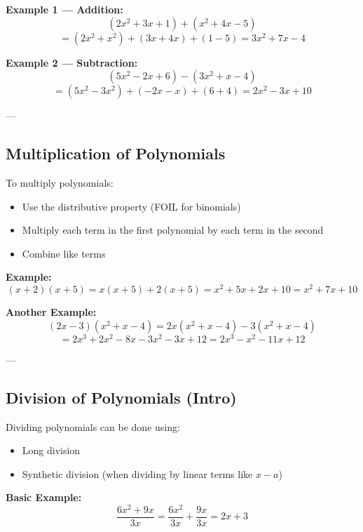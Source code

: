 \documentclass[11pt]{article}
\begin{document}
\textbf{Example 1 — Addition:}
\[
(2x^2 + 3x + 1) + (x^2 + 4x - 5)
\]
\[
= (2x^2 + x^2) + (3x + 4x) + (1 - 5) = 3x^2 + 7x - 4
\]

\textbf{Example 2 — Subtraction:}
\[
(5x^2 - 2x + 6) - (3x^2 + x - 4)
\]
\[
= (5x^2 - 3x^2) + (-2x - x) + (6 + 4) = 2x^2 - 3x + 10
\]

---

\subsection{Multiplication of Polynomials}

To multiply polynomials:
\begin{itemize}
  \item Use the distributive property (FOIL for binomials)
  \item Multiply each term in the first polynomial by each term in the second
  \item Combine like terms
\end{itemize}

\textbf{Example:}
\[
(x + 2)(x + 5)
= x(x + 5) + 2(x + 5)
= x^2 + 5x + 2x + 10
= x^2 + 7x + 10
\]

\textbf{Another Example:}
\[
(2x - 3)(x^2 + x - 4)
= 2x(x^2 + x - 4) - 3(x^2 + x - 4)
\]
\[
= 2x^3 + 2x^2 - 8x - 3x^2 - 3x + 12
= 2x^3 - x^2 - 11x + 12
\]

---

\subsection{Division of Polynomials (Intro)}

Dividing polynomials can be done using:
\begin{itemize}
  \item Long division
  \item Synthetic division (when dividing by linear terms like \( x - a \))
\end{itemize}

\textbf{Basic Example:}
\[
\frac{6x^2 + 9x}{3x} = \frac{6x^2}{3x} + \frac{9x}{3x} = 2x + 3
\]
\end{document}
